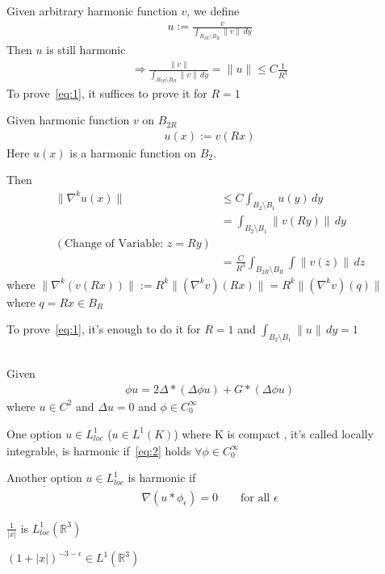 \documentclass[11pt]{article}
\begin{document}
Given arbitrary harmonic function $v$, we define
\begin{align*}
    u := \frac{v}{\int _{B_{2R}\setminus B_{R}}\| v \|  \, dy}
\end{align*}
Then $u$ is still harmonic
\begin{align*}
    \Longrightarrow \frac{\| v \| }{\int_{B_{2R}\setminus B_{R}} \| v \| \, dy}
    = \| u \|  \le C \frac{1}{R^{3}}
\end{align*}
To prove~\eqref{eq:1}, it suffices to prove it for $R=1$

Given harmonic function $v$ on $B_{2R}$
\begin{align*}
    u(x) := v(Rx)
\end{align*}
Here $u(x)$ is a harmonic function on $B_2$.

Then
\begin{align*}
    \| \nabla^{k} u(x) \|  &\le C \int_{B_2\setminus B_1} u(y) \, dy\\
    &=\int_{B_2 \setminus B_1} \| v(Ry) \| \, dy\\
    (\text{Change of Variable: } z=Ry) \\
    &= \frac{C}{R^{3}} \int_{B_{2R}\setminus B_{R}}\int \| v(z) \| \, dz
\end{align*}
where $\| \nabla^{k}(v(Rx)) \| := R^{k}\| (\nabla^k v)(Rx) \| = R^{k}\| 
(\nabla^{k}v)(q) \| $ where $q=Rx \in B_{R}$

To prove~\eqref{eq:1}, it's enough to do it for $R=1$ and 
$\int_{B_2 \setminus B_1} \| u \|\, dy = 1 $

\subsection{}
Given 
\begin{align}
    \label{eq:2}
    \phi u = 2 \Delta * (\Delta \phi u) + G * (\Delta \phi u)
\end{align}
where $u \in C^{2}$ and $\Delta u = 0$ and $\phi \in C_{0}^{\infty}$

$\underline{\text{One option}}$ $u \in L_{loc}^{1}$ ($u \in L^{1}(K)$) where K is compact
, it's called locally integrable, is harmonic if~\eqref{eq:2} holds $\forall  \phi \in C_{0}^{\infty}$

$\underline{\text{Another option}}$ $u \in L_{loc}^{1}$ is harmonic if
\begin{align*}
    \nabla (u * \phi_{\epsilon}) = 0 \qquad \text{for all } \epsilon
\end{align*}

\begin{example}
    \item $\frac{1}{|x|}$ is $L_{loc}^{1}(\mathbb{R}^3)$
    \item $(1+|x|)^{-3-\epsilon} \in L^{1}(\mathbb{R}^{3})$
\end{example}
\end{document}
